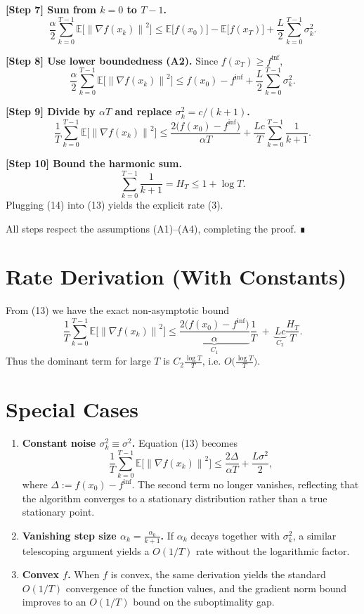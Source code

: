 \documentclass[11pt]{article}
\newcommand{\E}{\mathbb{E}}
\newcommand{\norm}[1]{\left\|#1\right\|}
\begin{document}
\noindent\textbf{[Step 7] Sum from $k=0$ to $T-1$.}
\[
\frac{\alpha}{2}\sum_{k=0}^{T-1}\E\!\big[\norm{\nabla f(x_{k})}^{2}\big]
\le \E\!\big[f(x_{0})\big]-\E\!\big[f(x_{T})\big]
   +\frac{L}{2}\sum_{k=0}^{T-1}\sigma_{k}^{2}.
\tag{11}
\]

\noindent\textbf{[Step 8] Use lower boundedness (A2).}
Since $f(x_{T})\ge f^{\inf}$,
\[
\frac{\alpha}{2}\sum_{k=0}^{T-1}\E\!\big[\norm{\nabla f(x_{k})}^{2}\big]
\le f(x_{0})-f^{\inf}
   +\frac{L}{2}\sum_{k=0}^{T-1}\sigma_{k}^{2}.
\tag{12}
\]

\noindent\textbf{[Step 9] Divide by $\alpha T$ and replace $\sigma_{k}^{2}=c/(k+1)$.}
\[
\frac{1}{T}\sum_{k=0}^{T-1}\E\!\big[\norm{\nabla f(x_{k})}^{2}\big]
\le
\frac{2\big(f(x_{0})-f^{\inf}\big)}{\alpha T}
+ \frac{Lc}{T}\sum_{k=0}^{T-1}\frac{1}{k+1}.
\tag{13}
\]

\noindent\textbf{[Step 10] Bound the harmonic sum.}
\[
\sum_{k=0}^{T-1}\frac{1}{k+1}= H_{T}\le 1+\log T.
\tag{14}
\]
Plugging (14) into (13) yields the explicit rate (3).

All steps respect the assumptions (A1)–(A4), completing the proof. ∎

\section*{Rate Derivation (With Constants)}
From (13) we have the exact non‑asymptotic bound
\[
\frac{1}{T}\sum_{k=0}^{T-1}\E\!\big[\norm{\nabla f(x_{k})}^{2}\big]
\le
\underbrace{\frac{2\big(f(x_{0})-f^{\inf}\big)}{\alpha}}_{\displaystyle C_{1}}
\frac{1}{T}
\;+\;
\underbrace{L c}_{\displaystyle C_{2}}
\frac{H_{T}}{T}.
\]
Thus the dominant term for large $T$ is $C_{2}\frac{\log T}{T}$, i.e. $O\!\big(\frac{\log T}{T}\big)$.

\section*{Special Cases}
\begin{enumerate}
\item \textbf{Constant noise $\sigma_{k}^{2}\equiv\sigma^{2}$.}  
Equation (13) becomes
\[
\frac{1}{T}\sum_{k=0}^{T-1}\E\!\big[\norm{\nabla f(x_{k})}^{2}\big]
\le \frac{2\Delta}{\alpha T}+ \frac{L\sigma^{2}}{2},
\]
where $\Delta:=f(x_{0})-f^{\inf}$.  The second term no longer vanishes, reflecting that the algorithm converges to a stationary distribution rather than a true stationary point.

\item \textbf{Vanishing step size $\alpha_{k}= \frac{\alpha_{0}}{k+1}$.}  
If $\alpha_{k}$ decays together with $\sigma_{k}^{2}$, a similar telescoping argument yields a $O(1/T)$ rate without the logarithmic factor.

\item \textbf{Convex $f$.}  
When $f$ is convex, the same derivation yields the standard $O(1/T)$ convergence of the function values, and the gradient norm bound improves to an $O(1/T)$ bound on the suboptimality gap.
\end{enumerate}
\end{document}
